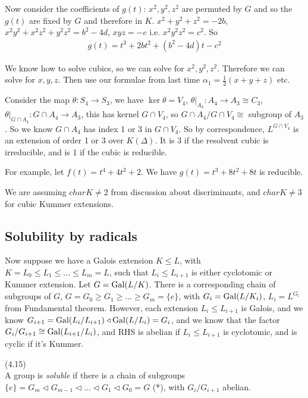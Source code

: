 \documentclass[a4paper]{article}
\begin{document}
Now consider the coefficients of $g(t)$: $x^2,y^2,z^2$ are permuted by $G$ and so the $g(t)$ are fixed by $G$ and therefore in $K$. $x^2+y^2+z^2 = -2b$, $x^2y^2+x^2z^2+y^2z^2 = b^2-4d$, $xyz = -c$ i.e. $x^2y^2z^2 = c^2$. So
\begin{equation*}
\begin{aligned}
g(t) = t^3 + 2bt^2 + (b^2-4d)t - c^2
\end{aligned}
\end{equation*}

We know how to solve cubics, so we can solve for $x^2,y^2,z^2$. Therefore we can solve for $x,y,z$. Then use our formulae from last time $\alpha_1 = \frac{1}{2}(x+y+z)$ etc.

\begin{rem}
Consider the map $\theta:S_4 \to S_3$, we have $\ker \theta = V_4$, $\theta|_{A_4}:A_4 \to A_3 \cong C_3$, $\theta|_{G \cap A_4} : G\cap A_4 \to A_3$, this has kernel $G \cap V_4$, so $G \cap A_4 / G \cap V_4 \cong $ subgroup of $A_3$. So we know $G\cap A_4$ has index 1 or 3 in $G \cap V_4$. So by correspondence, $L^{G \cap V_4}$ is an extension of order 1 or 3 over $K(\Delta)$. It is 3 if the resolvent cubic is irreducible, and is 1 if the cubic is reducible.
\end{rem}

For example, let $f(t) = t^4+4t^2+2$. We have $g(t) = t^3+8t^2+8t$ is reducible.

We are assuming $char K \neq 2$ from discussion about discriminants, and $char K \neq 3$ for cubic Kummer extensions.

\subsection{Solubility by radicals}
Now suppose we have a Galois extension $K \leq L$, with $K = L_0 \leq L_1 \leq ... \leq L_m = L$, such that $L_i \leq L_{i+1}$ is either cyclotomic or Kummer extension. Let $G = \operatorname{Gal}(L/K)$. There is a corresponding chain of subgroups of $G$, $G = G_0 \geq G_1 \geq ... \geq G_m = \{e\}$, with $G_i = \operatorname{Gal}(L/K_i)$, $L_i = L^{G_i}$ from Fundamental theorem. However, each extension $L_i \leq L_{i+1}$ is Galois, and we know $G_{i+1} = \operatorname{Gal}(L_i / L_{i+1}) \triangleleft \operatorname{Gal}(L/L_i) =  G_i$, and we know that the factor $G_i / G_{i+1} \cong \operatorname{Gal}(L_{i+1} / L_i)$, and RHS is abelian if $L_i \leq L_{i+1}$ is cyclotomic, and is cyclic if it's Kummer.

\begin{defi} (4.15)\\
A group is \emph{soluble} if there is a chain of subgroups $\{e\} = G_m \triangleleft G_{m-1} \triangleleft ... \triangleleft G_1 \triangleleft G_0 = G$ (*), with $G_i / G_{i+1}$ abelian.
\end{defi}
\end{document}
